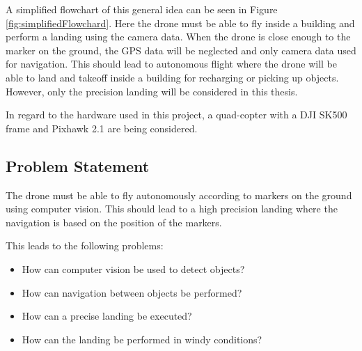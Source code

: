 \documentclass[../Head/Report.tex]{subfiles}
\begin{document}

A simplified flowchart of this general idea can be seen in Figure \ref{fig:simplifiedFlowchard}. Here the drone must be able to fly inside a building and perform a landing using the camera data. When the drone is close enough to the marker on the ground, the GPS data will be neglected and only camera data used for navigation. This should lead to autonomous flight where the drone will be able to land and takeoff inside a building for recharging or picking up objects. However, only the precision landing will be considered in this thesis. 

In regard to the hardware used in this project, a quad-copter with a DJI SK500 frame and Pixhawk 2.1 are being considered.   



\subsection{Problem Statement}

The drone must be able to fly autonomously according to markers on the ground using computer vision. This should lead to a high precision landing where the navigation is based on the position of the markers. 

This leads to the following problems:

\begin{itemize}
    \item How can computer vision be used to detect objects?
    \item How can navigation between objects be performed?
    \item How can a precise landing be executed?
    \item How can the landing be performed in windy conditions?
    
\end{itemize} 
\end{document}
